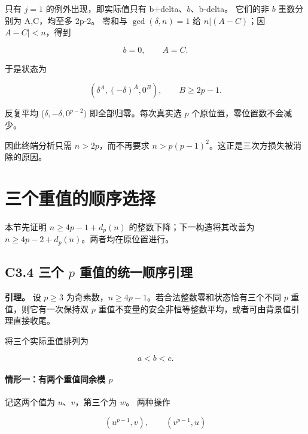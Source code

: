 \documentclass[11pt,a4paper]{article}
\theoremstyle{definition}
\numberwithin{equation}{section}
\begin{document}
{只有} {\ensuremath{j=1}} {的例外出现，即实际值只有} {b+delta、\ensuremath{b}、b-delta。} {它们的非} {\ensuremath{b}} {重数分别为} {A,C，均至多} {2p-2。} {零和与} {\ensuremath{\operatorname{gcd}(\delta ,n)=1}} {给} {\ensuremath{n|(A-C)}；因} {\textbar{}\ensuremath{A-C|<n}，得到}

\[
b=0,\qquad A=C.
\]

{于是状态为}

\[
\boxed{(\delta^A,(-\delta)^A,0^B),\qquad B\ge2p-1.}
\tag{C2.7}
\]

{反复平均} {(\ensuremath{\delta ,-\delta ,0^{p-2})}} {即全部归零。每次真实选} {\ensuremath{p}} {个原位置，零位置数不会减少。}

{因此终端分析只需} {\ensuremath{n>2p}，而不再要求} {\ensuremath{n>p(p-1)^{2}}。这正是三次方损失被消除的原因。}


\section{三个重值的顺序选择}\label{construct:three-heavy}
{本节先证明} \(n\ge4p-1+d_p(n)\) {的整数下降；下一构造将其改善为} \(n\ge4p-2+d_p(n)\){。两者均在原位置进行。}

\subsection*{\texorpdfstring{{C3.4} {三个} {\ensuremath{p}} {重值的统一顺序引理}}{C3.4 三个  重值的统一顺序引理}}\label{C3-h13}

\textbf{{引理。}} {设} {\ensuremath{p\ge 3}} {为奇素数，\ensuremath{n\ge 4p-1}。若合法整数零和状态恰有三个不同} {\ensuremath{p}} {重值，则它有一次保持双} {\ensuremath{p}} {重值不变量的安全非恒等整数平均，或者可由背景值引理直接收尾。}

{将三个实际重值排列为}

\[
a<b<c.
\]

\paragraph*{\texorpdfstring{{情形一：有两个重值同余模} {\ensuremath{p}}}{情形一：有两个重值同余模 }}\label{C3-h14}

{记这两个值为} {\ensuremath{u}、\ensuremath{v}，第三个为} {\ensuremath{w}。} {两种操作}

\[
(u^{p-1},v),\qquad(v^{p-1},u)
\]
\end{document}

